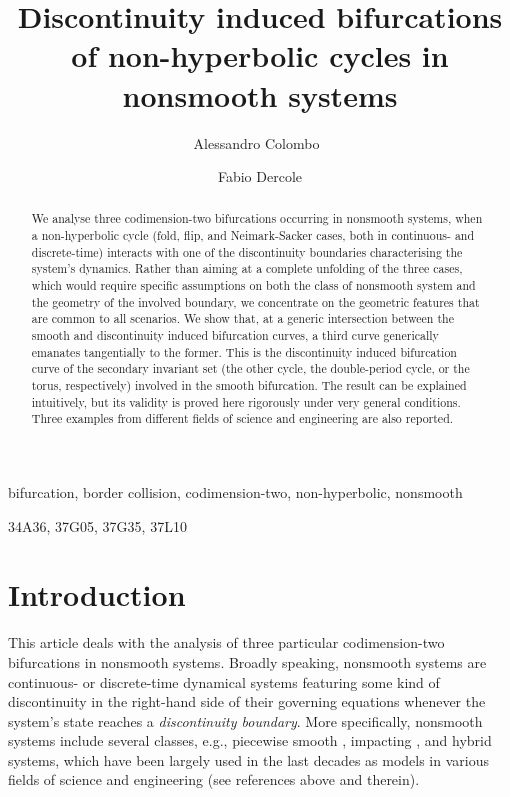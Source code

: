 \documentclass[final,onefignum]{siamltex}
\author{Alessandro Colombo\footnotemark[2]\ \footnotemark[3] \and Fabio Dercole\footnotemark[2]}
\title{Discontinuity induced bifurcations of non-hyperbolic cycles in nonsmooth systems}
\begin{document}
\maketitle


\begin{abstract}
We analyse three codimension-two bifurcations occurring in nonsmooth systems, when a non-hyperbolic cycle (fold, flip, and Neimark-Sacker cases, both in continuous- and discrete-time) interacts with one of the discontinuity boundaries characterising the system's dynamics. Rather than aiming at a complete unfolding of the three cases, which would require specific assumptions on both the class of nonsmooth system and the geometry of the involved boundary, we concentrate on the geometric features that are common to all scenarios.  We show that, at a generic intersection between the smooth and discontinuity induced bifurcation curves, a third curve generically emanates tangentially to the former.  This is the discontinuity induced bifurcation curve of the secondary invariant set (the other cycle, the double-period cycle, or the torus, respectively) involved in the smooth bifurcation.  The result can be explained intuitively, but its validity is proved here rigorously under very general conditions.  Three examples from different fields of science and engineering are also reported.
\end{abstract}

\begin{keywords} 
bifurcation, border collision, codimension-two, non-hyperbolic, nonsmooth
\end{keywords}

\begin{AMS}
34A36, 37G05, 37G35, 37L10
\end{AMS}

\pagestyle{myheadings}
\thispagestyle{plain}

\section{Introduction}
\label{sec:int}
This article deals with the analysis of three particular codimension-two bifurcations in nonsmooth systems. Broadly speaking, nonsmooth systems are continuous- or discrete-time dynamical systems featuring some kind of discontinuity in the right-hand side of their governing equations whenever the system's state reaches a {\it discontinuity boundary}.
More specifically, nonsmooth systems include several classes, e.g., piecewise smooth \citep{Filippov88, Bernardo08}, impacting \citep{Brogliato99}, and hybrid \citep{Branicky98b, Lygeros03} systems, which have been largely used in the last decades as models in various fields of science and engineering (see references above and therein).
\end{document}
